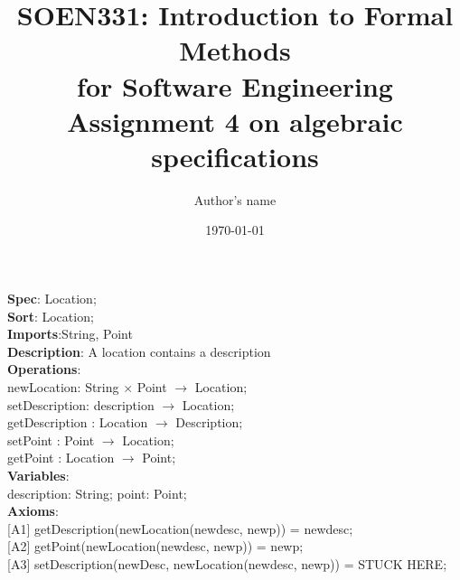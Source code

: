 \documentclass[12pt]{article}
\title{SOEN331: Introduction to Formal Methods\\for Software Engineering\\
Assignment 4 on algebraic specifications}
\author{Author's name}
\date{\today}
\begin{document}
\begin{spacing}{1.5}

\maketitle

\noindent \textbf{Spec}: Location;\\
\noindent \textbf{Sort}: Location;\\
\noindent \textbf{Imports}:String, Point\\
\noindent \textbf{Description}: A location contains a description \\
\noindent \textbf{Operations}:\\
\hspace*{5mm} newLocation: String $\times$ Point $\rightarrow$ Location;\\
\hspace*{5mm} setDescription: description $\rightarrow$ Location;\\
\hspace*{5mm} getDescription : Location $\rightarrow$ Description;\\
\hspace*{5mm} setPoint : Point $\rightarrow$ Location;\\
\hspace*{5mm} getPoint : Location $\rightarrow$ Point;\\
\noindent \textbf{Variables}:\\
\hspace*{5mm} description: String; point: Point;\\
\noindent \textbf{Axioms}:\\
\hspace*{5mm} [A1] getDescription(newLocation(newdesc, newp)) = newdesc;\\
\hspace*{5mm} [A2] getPoint(newLocation(newdesc, newp)) = newp;\\
\hspace*{5mm} [A3] setDescription(newDesc, newLocation(newdesc, newp)) = STUCK HERE;\\



\end{spacing}
\end{document}

